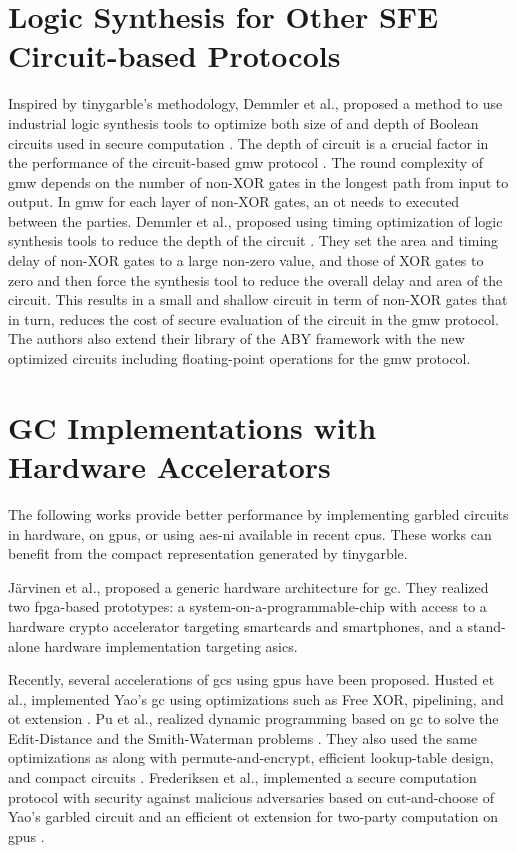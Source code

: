 \section{Logic Synthesis for Other SFE Circuit-based Protocols} \label{sec:related-logic}
Inspired by \gls{tinygarble}'s methodology, Demmler et al., proposed a method to use industrial logic synthesis tools to optimize both size of and depth of Boolean circuits used in secure computation \cite{demmler2015automated}.
The depth of circuit is a crucial factor in the performance of the circuit-based \acrfull{gmw} protocol \cite{goldreich1987play}.
The round complexity of \acrshort{gmw} depends on the number of non-XOR gates in the longest path from input to output.
In \acrshort{gmw} for each layer of non-XOR gates, an \acrshort{ot} needs to executed between the parties.
Demmler et al., proposed using timing optimization of logic synthesis tools to reduce the depth of the circuit \cite{demmler2015automated}.
They set the area and timing delay of non-XOR gates to a large non-zero value, and those of XOR gates to zero and then force the synthesis tool to reduce the overall delay and area of the circuit.
This results in a small and shallow circuit in term of non-XOR gates that in turn, reduces the cost of secure evaluation of the circuit in the \acrshort{gmw} protocol.
The authors also extend their library of the ABY framework \cite{demmler2015aby} with the new optimized circuits including floating-point operations for the \acrshort{gmw} protocol.

\section{GC Implementations with Hardware Accelerators} \label{sec:related-hardware}
The following works provide better performance by implementing garbled circuits in hardware, on \acrshort{gpu}s, or using \acrshort{aes-ni} available in recent \acrshort{cpu}s.
These works can benefit from the compact representation generated by \gls{tinygarble}.

J\"arvinen et al., \cite{jarvinen2010garbled} proposed a generic hardware architecture for \acrshort{gc}.
They realized two \acrshort{fpga}-based prototypes: a system-on-a-programmable-chip with access to a hardware crypto accelerator targeting smartcards and smartphones, and a stand-alone hardware implementation targeting \acrshort{asic}s.

Recently, several accelerations of \acrshort{gc}s using \acrshort{gpu}s have been proposed.
Husted et al., implemented Yao's \acrshort{gc} using optimizations such as Free XOR, pipelining, and \acrshort{ot} extension \cite{husted2013gpu}.
Pu et al., realized dynamic programming based on \acrshort{gc} to solve the Edit-Distance and the Smith-Waterman problems \cite{pu2013computing}.
They also used the same optimizations as \cite{husted2013gpu} along with permute-and-encrypt, efficient lookup-table design, and compact circuits \cite{pu2013computing}.
Frederiksen et al., implemented a secure computation protocol with security against malicious adversaries based on cut-and-choose of Yao's garbled circuit and an efficient \acrshort{ot} extension for two-party computation on \acrshort{gpu}s \cite{frederiksen2013fast}.

